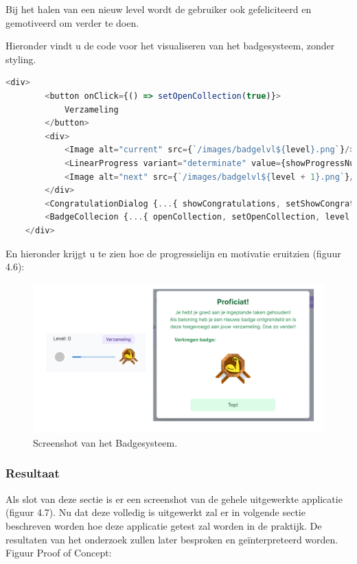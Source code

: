 Bij het halen van een nieuw level wordt de gebruiker ook gefeliciteerd en gemotiveerd om verder te doen. \newline

Hieronder vindt u de code voor het visualiseren van het badgesysteem, zonder styling.

\begin{lstlisting}[language=JavaScript, caption={Code Snippet - Badges}, label={lst:codesnippet4}, frame=single, breaklines=true, backgroundcolor=\color{lightgray}]
    <div>        
        <button onClick={() => setOpenCollection(true)}>
            Verzameling
        </button>
        <div>
            <Image alt="current" src={`/images/badgelvl${level}.png`}/>
            <LinearProgress variant="determinate" value={showProgressNumber} />    
            <Image alt="next" src={`/images/badgelvl${level + 1}.png`}/>
        </div>              
        <CongratulationDialog {...{ showCongratulations, setShowCongratulations, level }}/>
        <BadgeCollecion {...{ openCollection, setOpenCollection, level }}/>
    </div>
\end{lstlisting}

En hieronder krijgt u te zien hoe de progressielijn en motivatie eruitzien (figuur 4.6):

\begin{figure}[h]
    \centering
    \includegraphics[width=\textwidth]{graphics/screenshot_badgesysteem.png}
    \caption{Screenshot van het Badgesysteem.}
    \label{fig:screenshot_badges}
\end{figure}


\subsubsection{Resultaat}
Als slot van deze sectie is er een screenshot van de gehele uitgewerkte applicatie (figuur 4.7). Nu dat deze volledig is uitgewerkt zal er in volgende sectie beschreven worden hoe deze applicatie getest zal worden in de praktijk. De resultaten van het onderzoek zullen later besproken en geïnterpreteerd worden.\newline
Figuur Proof of Concept: 

